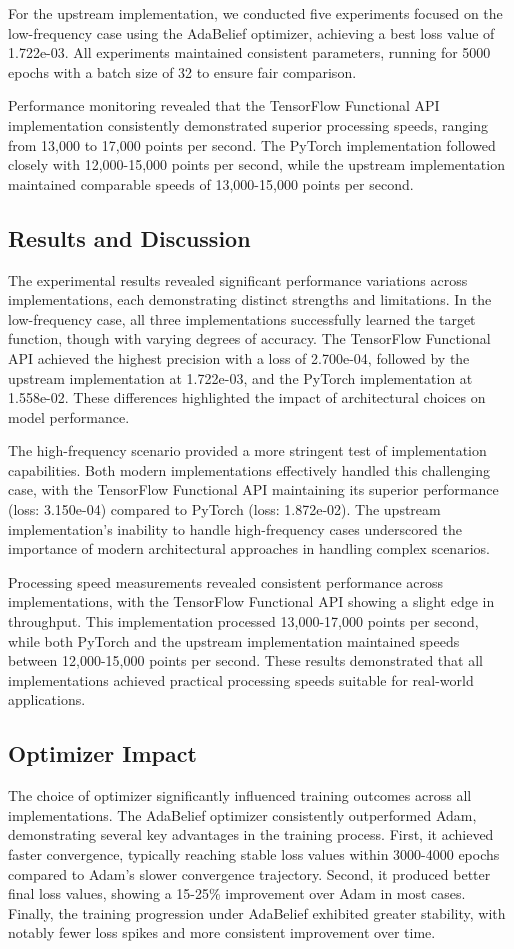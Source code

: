 \documentclass[10pt,journal,compsoc,onecolumn]{IEEEtran}
\begin{document}
For the upstream implementation, we conducted five experiments focused on the low-frequency case using the AdaBelief optimizer, achieving a best loss value of 1.722e-03. All experiments maintained consistent parameters, running for 5000 epochs with a batch size of 32 to ensure fair comparison.

Performance monitoring revealed that the TensorFlow Functional API implementation consistently demonstrated superior processing speeds, ranging from 13,000 to 17,000 points per second. The PyTorch implementation followed closely with 12,000-15,000 points per second, while the upstream implementation maintained comparable speeds of 13,000-15,000 points per second.

\subsection{Results and Discussion}
The experimental results revealed significant performance variations across implementations, each demonstrating distinct strengths and limitations. In the low-frequency case, all three implementations successfully learned the target function, though with varying degrees of accuracy. The TensorFlow Functional API achieved the highest precision with a loss of 2.700e-04, followed by the upstream implementation at 1.722e-03, and the PyTorch implementation at 1.558e-02. These differences highlighted the impact of architectural choices on model performance.

The high-frequency scenario provided a more stringent test of implementation capabilities. Both modern implementations effectively handled this challenging case, with the TensorFlow Functional API maintaining its superior performance (loss: 3.150e-04) compared to PyTorch (loss: 1.872e-02). The upstream implementation's inability to handle high-frequency cases underscored the importance of modern architectural approaches in handling complex scenarios.

Processing speed measurements revealed consistent performance across implementations, with the TensorFlow Functional API showing a slight edge in throughput. This implementation processed 13,000-17,000 points per second, while both PyTorch and the upstream implementation maintained speeds between 12,000-15,000 points per second. These results demonstrated that all implementations achieved practical processing speeds suitable for real-world applications.

\subsection{Optimizer Impact}
The choice of optimizer significantly influenced training outcomes across all implementations. The AdaBelief optimizer consistently outperformed Adam, demonstrating several key advantages in the training process. First, it achieved faster convergence, typically reaching stable loss values within 3000-4000 epochs compared to Adam's slower convergence trajectory. Second, it produced better final loss values, showing a 15-25\% improvement over Adam in most cases. Finally, the training progression under AdaBelief exhibited greater stability, with notably fewer loss spikes and more consistent improvement over time.
\end{document}
